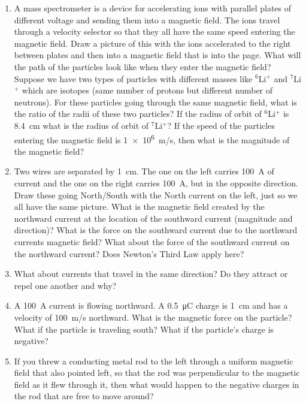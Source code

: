 \begin{enumerate}
\item
A mass spectrometer is a device for accelerating ions with parallel plates of different voltage and sending them into a magnetic field. The ions travel through a velocity selector so that they all have the same speed entering the magnetic field. Draw a picture of this with the ions accelerated to the right between plates and then into a magnetic field that is into the page. What will the path of the particles look like when they enter the magnetic field? Suppose we have two types of particles with different masses like $^6$Li$^+$ and $^7$Li$^+$ which are isotopes (same number of protons but different number of neutrons). For these particles going through the same magnetic field, what is the ratio of the radii of these two particles? If the radius of orbit of $^6$Li$^+$ is \SI{8.4}{cm} what is the radius of orbit of $^7$Li$^+$? If the speed of the particles entering the magnetic field is \SI{1e6}{m/s}, then what is the magnitude of the magnetic field?

\item
Two wires are separated by \SI{1}{cm}. The one on the left carries \SI{100}{\ampere} of current and the one on the right carries \SI{100}{\ampere}, but in the opposite direction. Draw these going North/South with the North current on the left, just so we all have the same picture. What is the magnetic field created by the northward current at the location of the southward current (magnitude and direction)? What is the force on the southward current due to the northward currents magnetic field? What about the force of the southward current on the northward current? Does Newton's Third Law apply here?

\item
What about currents that travel in the same direction? Do they attract or repel one another and why?

\item
A \SI{100}{\ampere} current is flowing northward. A \SI{+0.5}{\micro\coulomb} charge is \SI{1}{\centi\meter} and has a velocity of \SI{100}{m/s} northward. What is the magnetic force on the particle? What if the particle is traveling south? What if the particle's charge is negative? 


\item
If you threw a conducting metal rod to the left through a uniform magnetic field that also pointed left, so that the rod was perpendicular to the magnetic field as it flew through it, then what would happen to the negative charges in the rod that are free to move around? 


\end{enumerate}
